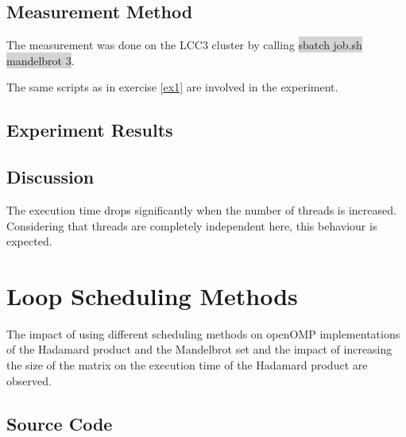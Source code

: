 \documentclass[parskip]{scrartcl}
\begin{document}
	\subsection{Measurement Method}
	The measurement was done on the LCC3 cluster by calling \colorbox{lightgray}{sbatch job.sh mandelbrot 3}.
	
	The same scripts as in exercise \ref{ex1} are involved in the experiment.
	
	\subsection{Experiment Results}
	
	\subsection{Discussion}
	The execution time drops significantly when the number of threads is increased. Considering that threads are completely independent here, this behaviour is expected.
	
	\section{Loop Scheduling Methods}
	The impact of using different scheduling methods on openOMP implementations of the Hadamard product and the Mandelbrot set and the impact of increasing the size of the matrix on the execution time of the Hadamard product are observed.
	
	\subsection{Source Code}
	\inputminted	[linenos]{c}{ex3/hadamard.c}
\end{document}
